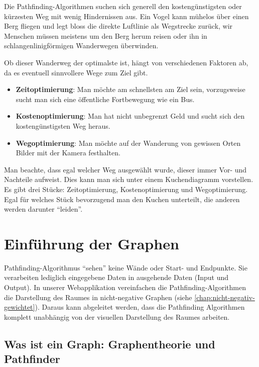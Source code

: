 Die Pathfinding-Algorithmen suchen sich generell den kostengünstigsten
oder kürzesten Weg mit wenig Hindernissen aus. Ein Vogel kann mühelos
über einen Berg fliegen und legt bloss die direkte Luftlinie als
Wegstrecke zurück, wir Menschen müssen meistens um den Berg herum reisen
oder ihn in schlangenlinigförmigen Wanderwegen überwinden.

Ob dieser Wanderweg der optimalste ist, hängt von verschiedenen Faktoren
ab, da es eventuell sinnvollere Wege zum Ziel gibt.

\begin{itemize}
\item
  \textbf{Zeitoptimierung}: Man möchte am schnellsten am Ziel sein, vorzugsweise sucht man sich
  eine öffentliche Fortbewegung wie ein Bus.
\item
  \textbf{Kostenoptimierung}: Man hat nicht unbegrenzt Geld und sucht sich den kostengünstigsten Weg
  heraus.
\item
  \textbf{Wegoptimierung}: Man möchte auf der Wanderung von gewissen Orten Bilder mit der Kamera
  festhalten.
\end{itemize}

Man beachte, dass egal welcher Weg ausgewählt wurde, dieser immer Vor-
und Nachteile aufweist. Dies kann man sich unter einem Kuchendiagramm vorstellen.
Es gibt drei Stücke: Zeitoptimierung, Kostenoptimierung und
Wegoptimierung. Egal für welches Stück bevorzugend man den Kuchen
unterteilt, die anderen werden darunter ``leiden''.
\cite[Wikipedia, 2018]{wikipath}

\section{Einführung der Graphen}

Pathfinding-Algorithmus ``sehen'' keine Wände oder Start- und
Endpunkte. Sie verarbeiten lediglich eingegebene Daten in ausgehende
Daten (Input und Output). In unserer Webapplikation vereinfachen die
Pathfinding-Algorithmen die Darstellung des Raumes in nicht-negative
 Graphen (siehe \autoref{chap:nicht-negativ-gewichtet}). Daraus kann abgeleitet
werden, dass die Pathfinding Algorithmen komplett unabhängig von der
visuellen Darstellung des Raumes arbeiten.
\cite[Andreas Hofmann, 2013]{pfbsc}

\subsection{Was ist ein Graph: Graphentheorie und Pathfinder}


